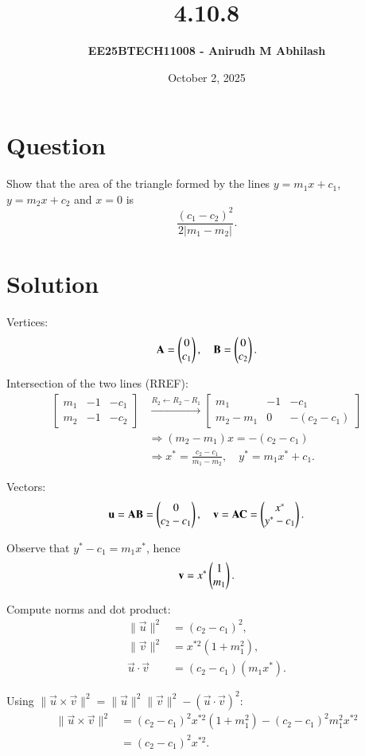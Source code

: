 \documentclass[12pt]{article}
\title{\textbf{4.10.8}}
\author{\textbf{EE25BTECH11008 - Anirudh M Abhilash}}
\date{October 2, 2025}
\begin{document}
\maketitle

\section*{Question}
Show that the area of the triangle formed by the lines $y=m_1x+c_1$, $y=m_2x+c_2$ and $x=0$ is
\[
\frac{(c_1-c_2)^2}{2\lvert m_1-m_2\rvert}.
\]

\section*{Solution}
Vertices:
\[
\mathbf{A} = \begin{pmatrix}0\\c_1\end{pmatrix}, \quad \mathbf{B} = \begin{pmatrix}0\\c_2\end{pmatrix}.
\]

Intersection of the two lines (RREF):
\begin{align}
\left[\begin{array}{cc|c}
 m_1 & -1 & -c_1 \\
 m_2 & -1 & -c_2
\end{array}\right]
&\xrightarrow{R_2 \leftarrow R_2 - R_1}
\left[\begin{array}{cc|c}
 m_1 & -1 & -c_1 \\
 m_2-m_1 & 0 & -(c_2-c_1)
\end{array}\right] \\
&\Rightarrow (m_2-m_1)x = -(c_2-c_1) \nonumber \\
&\Rightarrow x^* = \frac{c_2-c_1}{m_1-m_2}, \quad y^* = m_1 x^* + c_1.
\end{align}

Vectors:
\[
\mathbf{u} = \mathbf{AB} = \begin{pmatrix}0\\c_2-c_1\end{pmatrix}, \quad
\mathbf{v} = \mathbf{AC} = \begin{pmatrix}x^*\\y^*-c_1\end{pmatrix}.
\]

Observe that $y^* - c_1 = m_1 x^*$, hence
\[
\mathbf{v} = x^* \begin{pmatrix}1\\m_1\end{pmatrix}.
\]

Compute norms and dot product:
\begin{align}
\|\vec{u}\|^2 &= (c_2-c_1)^2, \\
\|\vec{v}\|^2 &= x^{*2}(1+m_1^2), \\
\vec{u}\cdot \vec{v} &= (c_2-c_1)(m_1 x^*).
\end{align}

Using $\|\vec{u} \times \vec{v}\|^2 = \|\vec{u}\|^2 \|\vec{v}\|^2 - (\vec{u} \cdot \vec{v})^2$:
\begin{align}
\|\vec{u} \times \vec{v}\|^2 &= (c_2-c_1)^2 x^{*2}(1+m_1^2) - (c_2-c_1)^2 m_1^2 x^{*2} \\
&= (c_2-c_1)^2 x^{*2}.
\end{align}
\end{document}
